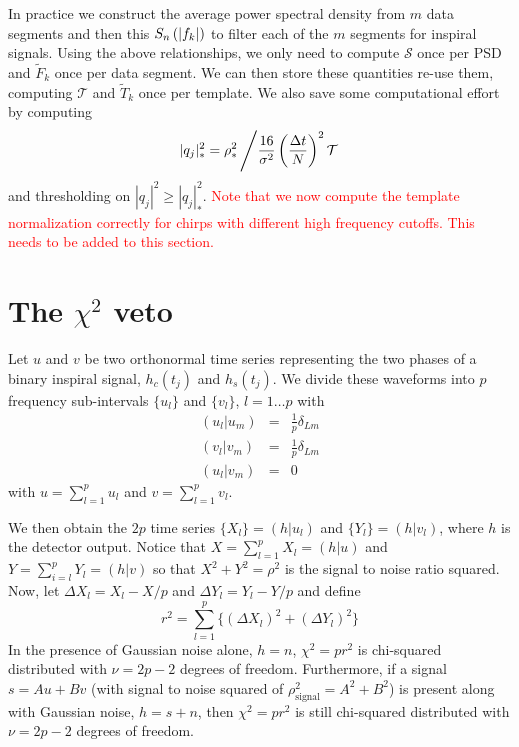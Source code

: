 In practice we construct the average power spectral density from $m$ data
segments and then this $S_n\left(\left|f_{k}\right|\right)$ to filter each of the $m$ segments for
inspiral signals. Using the above relationships, we only need to compute
$\mathcal{S}$ once per PSD and $\tilde{F}_k$ once per data segment. We can
then store these quantities re-use them, computing $\mathcal{T}$ and
$\tilde{T}_k$ once per template. We also save some computational effort by
computing
\begin{equation}
|q_j|^2_\ast = \rho^2_\ast \left/
\frac{16}{\sigma^2}\left(\frac{\Delta t}{N}\right)^2 \mathcal{T} \right.
\end{equation}
and thresholding on $|q_j|^2 \ge |q_j|^2_\ast$. \textcolor{red}{Note that we
now compute the template normalization correctly for chirps with different
high frequency cutoffs. This needs to be added to this section.}

\section{The $\chi^2$ veto}
\label{s:chisq}

Let $u$ and $v$ be two orthonormal time series representing the two phases of a
binary inspiral signal, $h_c(t_j)$ and $h_s(t_j)$.  We divide these waveforms
into $p$ frequency sub-intervals $\{u_l\}$ and $\{v_l\}$, $l=1\ldots p$ with
\begin{eqnarray}
  (u_l|u_m) &=& \frac{1}{p}\delta_{Lm} \\
  (v_l|v_m) &=& \frac{1}{p}\delta_{Lm} \\
  (u_l|v_m) &=& 0
\end{eqnarray}
with $u=\sum_{l=1}^p u_l$ and $v=\sum_{l=1}^p v_l$.

We then obtain the $2p$ time series $\{X_l\}=(h|u_l)$ and $\{Y_l\}=(h|v_l)$,
where $h$ is the detector output. Notice that  $X=\sum_{l=1}^p X_l=(h|u)$ and
$Y=\sum_{i=l}^p Y_l=(h|v)$ so that $X^2+Y^2=\rho^2$ is the signal to noise
ratio squared. Now, let $\Delta X_l=X_l-X/p$ and $\Delta Y_l=Y_l-Y/p$ and
define
\begin{equation}
  r^2 = \sum_{l=1}^p \bigl\{ (\Delta X_l)^2 + (\Delta Y_l)^2 \bigr\}
\end{equation}
In the presence of Gaussian noise alone, $h=n$, $\chi^2=pr^2$ is chi-squared
distributed with $\nu=2p-2$ degrees of freedom.  Furthermore, if a signal
$s=Au+Bv$ (with signal to noise squared of $\rho^2_{\mathrm{signal}}=A^2+B^2$) 
is present along with Gaussian noise, $h=s+n$, then $\chi^2=pr^2$ is still
chi-squared distributed with $\nu=2p-2$ degrees of freedom.

